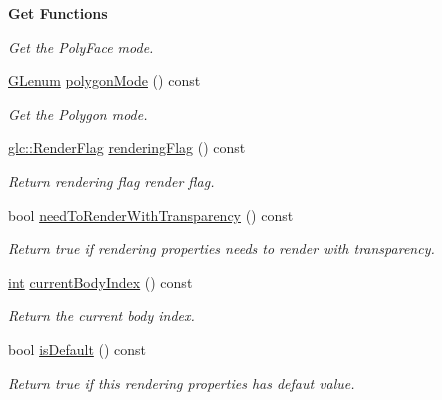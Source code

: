 \begin{Indent}{\bf Get Functions}
\begin{DoxyCompactItemize}
\begin{DoxyCompactList}\small\item\em Get the Poly\-Face mode. \end{DoxyCompactList}\item 
\hyperlink{glext_8h_a508b2dec21679e2e346cad3e0d1969bf}{G\-Lenum} \hyperlink{class_g_l_c___render_properties_a3ad89fd3236a3d97cf6de09a4eb201eb}{polygon\-Mode} () const 
\begin{DoxyCompactList}\small\item\em Get the Polygon mode. \end{DoxyCompactList}\item 
\hyperlink{namespaceglc_a51a421b53283d5996142222b9baca26c}{glc\-::\-Render\-Flag} \hyperlink{class_g_l_c___render_properties_a8971a2d5b625dcd848ea259bf0147fe5}{rendering\-Flag} () const 
\begin{DoxyCompactList}\small\item\em Return rendering flag render flag. \end{DoxyCompactList}\item 
bool \hyperlink{class_g_l_c___render_properties_a2d2160a9866e56dfedee59de82d949d2}{need\-To\-Render\-With\-Transparency} () const 
\begin{DoxyCompactList}\small\item\em Return true if rendering properties needs to render with transparency. \end{DoxyCompactList}\item 
\hyperlink{ioapi_8h_a787fa3cf048117ba7123753c1e74fcd6}{int} \hyperlink{class_g_l_c___render_properties_ad01d64dc2d56de5141b77ffab8ed8eb2}{current\-Body\-Index} () const 
\begin{DoxyCompactList}\small\item\em Return the current body index. \end{DoxyCompactList}\item 
bool \hyperlink{class_g_l_c___render_properties_a0069a50ee68405d6f954e4d64f7e84ac}{is\-Default} () const 
\begin{DoxyCompactList}\small\item\em Return true if this rendering properties has defaut value. \end{DoxyCompactList}\end{DoxyCompactItemize}
\end{Indent}

